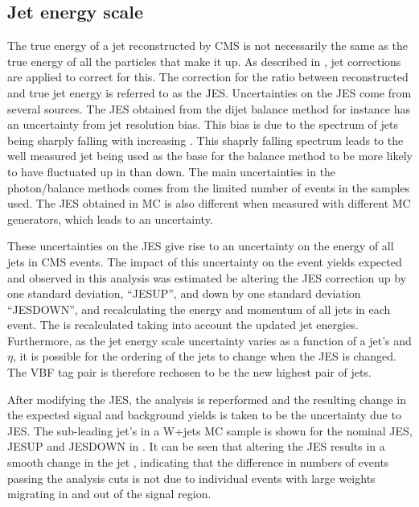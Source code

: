 \subsection{Jet energy scale}
\label{sec:promptjes}
The true energy of a jet reconstructed by CMS is not necessarily the same as the true energy of all the particles that make it up. As described in , jet corrections are applied to correct for this. The correction for the ratio between reconstructed and true jet energy is referred to as the \ac{JES}. Uncertainties on the \ac{JES} come from several sources. The \ac{JES} obtained from the dijet \pt balance method for instance has an uncertainty from jet resolution bias. This bias is due to the \pt spectrum of jets being sharply falling with increasing \pt. This shaprly falling \pt spectrum leads to the well measured jet being used as the base for the balance method to be more likely to have fluctuated up in \pt than down. The main uncertainties in the photon/\PZ balance methods comes from the limited number of events in the samples used. The \ac{JES} obtained in \ac{MC} is also different when measured with different \ac{MC} generators, which leads to an uncertainty.

These uncertainties on the \ac{JES} give rise to an uncertainty on the energy of all jets in CMS events. The impact of this uncertainty on the event yields expected and observed in this analysis was estimated be altering the \ac{JES} correction up by one standard deviation, ``JESUP'', and down by one standard deviation ``JESDOWN'', and recalculating the energy and momentum of all jets in each event. The \MET is recalculated taking into account the updated jet energies. Furthermore, as the jet energy scale uncertainty varies as a function of a jet's \pt and $\eta$, it is possible for the \pt ordering of the jets to change when the \ac{JES} is changed. The \ac{VBF} tag pair is therefore rechosen to be the new highest \pt pair of jets. 

After modifying the \ac{JES}, the analysis is reperformed and the resulting change in the expected signal and background yields is taken to be the uncertainty due to \ac{JES}. The sub-leading jet's \pt in a W+jets \ac{MC} sample is shown for the nominal \ac{JES}, JESUP and JESDOWN in . It can be seen that altering the \ac{JES} results in a smooth change in the jet \pt, indicating that the difference in numbers of events passing the analysis cuts is not due to individual events with large weights migrating in and out of the signal region.

